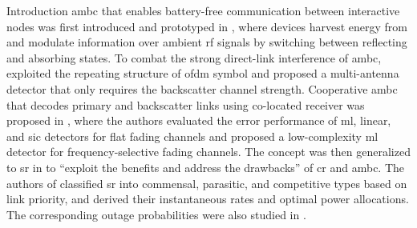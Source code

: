 \documentclass[journal]{IEEEtran}
\begin{document}
\begin{section}{Introduction}
	\gls{ambc} that enables battery-free communication between interactive nodes was first introduced and prototyped in \cite{Liu2013b}, where devices harvest energy from and modulate information over ambient \gls{rf} signals by switching between reflecting and absorbing states.
	To combat the strong direct-link interference of \gls{ambc}, \cite{Yang2018d} exploited the repeating structure of \gls{ofdm} symbol and proposed a multi-antenna detector that only requires the backscatter channel strength.
	Cooperative \gls{ambc} that decodes primary and backscatter links using co-located receiver was proposed in \cite{Yang2018}, where the authors evaluated the error performance of \gls{ml}, linear, and \gls{sic} detectors for flat fading channels and proposed a low-complexity \gls{ml} detector for frequency-selective fading channels.
	The concept was then generalized to \gls{sr} in \cite{Liang2020} to ``exploit the benefits and address the drawbacks'' of \gls{cr} and \gls{ambc}.
	The authors of \cite{Guo2019b} classified \gls{sr} into commensal, parasitic, and competitive types based on link priority, and derived their instantaneous rates and optimal power allocations.
	The corresponding outage probabilities were also studied in \cite{Ding2020}.

\end{section}
\end{document}
